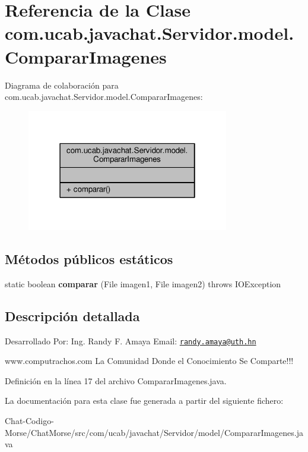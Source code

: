 \hypertarget{classcom_1_1ucab_1_1javachat_1_1_servidor_1_1model_1_1_comparar_imagenes}{\section{Referencia de la Clase com.\-ucab.\-javachat.\-Servidor.\-model.\-Comparar\-Imagenes}
\label{classcom_1_1ucab_1_1javachat_1_1_servidor_1_1model_1_1_comparar_imagenes}
}


Diagrama de colaboración para com.\-ucab.\-javachat.\-Servidor.\-model.\-Comparar\-Imagenes\-:
\nopagebreak
\begin{figure}[H]
\begin{center}
\leavevmode
\includegraphics[width=250pt]{d7/d91/classcom_1_1ucab_1_1javachat_1_1_servidor_1_1model_1_1_comparar_imagenes__coll__graph}
\end{center}
\end{figure}
\subsection*{Métodos públicos estáticos}
\begin{DoxyCompactItemize}
\item 
\hypertarget{classcom_1_1ucab_1_1javachat_1_1_servidor_1_1model_1_1_comparar_imagenes_a35bd16d8d9c4c2bd3148cc5f1918f349}{static boolean {\bfseries comparar} (File imagen1, File imagen2)  throws I\-O\-Exception 	}\label{classcom_1_1ucab_1_1javachat_1_1_servidor_1_1model_1_1_comparar_imagenes_a35bd16d8d9c4c2bd3148cc5f1918f349}

\end{DoxyCompactItemize}


\subsection{Descripción detallada}
Desarrollado Por\-: Ing. Randy F. Amaya Email\-: \href{mailto:randy.amaya@uth.hn}{\tt randy.\-amaya@uth.\-hn}

www.\-computrachos.\-com La Comunidad Donde el Conocimiento Se Comparte!!! 

Definición en la línea 17 del archivo Comparar\-Imagenes.\-java.



La documentación para esta clase fue generada a partir del siguiente fichero\-:\begin{DoxyCompactItemize}
\item 
Chat-\/\-Codigo-\/\-Morse/\-Chat\-Morse/src/com/ucab/javachat/\-Servidor/model/Comparar\-Imagenes.\-java\end{DoxyCompactItemize}
